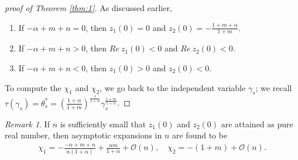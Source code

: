 \documentclass[a4paper,11pt]{article}
\theoremstyle{remark}
\newtheorem{remark}{Remark}[section]
\begin{document}
\begin{proof}[proof of Theorem \ref{thm:1}]
 As discussed earlier,
 \begin{enumerate}
  \item If $-\alpha+m+n=0$, then $z_1(0)=0$ and $z_2(0)= -\frac{1+m+\alpha}{1+m}$.
  \item If $-\alpha+m+n>0$, then $Re ~z_1(0)<0$ and $Re ~z_2(0)<0$.
  \item If $-\alpha+m+n<0$, then $z_1(0)>0$ and $z_2(0)<0$.
 \end{enumerate}
To compute the $\chi_1$ and $\chi_2$, we go back to the independent variable $\gamma_s$; we recall $\tau(\gamma_s)= \theta_s^*=\left( \frac{1+\alpha}{1+m}\right)^{\frac{1}{1+\alpha}} \gamma_s^{\frac{1+m}{1+\alpha}}$. 
\end{proof}
\begin{remark}
 If $n$ is sufficiently small that $z_1(0)$ and $z_2(0)$ are attained as pure real number, then asymptotic expansions in $n$ are found to be
\begin{align*}
 \chi_1 = -\frac{-\alpha+m+n}{n(1+\alpha)} + \frac{\alpha m}{1+\alpha} + \mathcal{O}(n), \quad
 \chi_2 = -(1+m)  + \mathcal{O}(n).
\end{align*} 
\end{remark}
\end{document}
